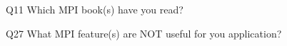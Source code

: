 \begin{description}%
\item{Q11} Which MPI book(s) have you read?%
\item{Q27} What MPI feature(s) are NOT useful for you application?%
\end{description}%
